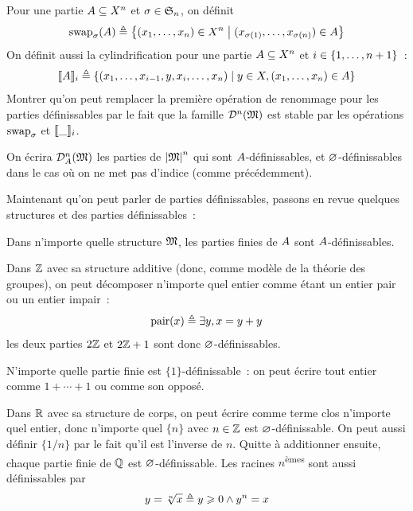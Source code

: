 \begin{exercise}
  Pour une partie $A\subseteq X^n$ et $\sigma\in\mathfrak{S}_{n}$, on
  définit
  \[\operatorname{swap}_{\sigma}(A) \triangleq
  \left\{ (x_1,\ldots,x_n)\in X^n \;\middle\vert\; (x_{\sigma(1)},\ldots,x_{\sigma(n)})\in A \right\}
  \]
  On définit aussi la cylindrification pour une partie $A\subseteq X^n$
  et $i\in\{1,\ldots,n+1\}$~:
  \[\llbracket A\rrbracket_i \triangleq
  \left\{ (x_1,\ldots,x_{i-1},y,x_i,\ldots,x_n) \;\middle\vert\; y \in X, (x_1,\ldots,x_n)\in A \right\}\]
  Montrer qu'on peut remplacer la première opération de renommage pour les
  parties définissables par le fait que la famille $\mathcal{D}^{n}(\mathfrak{M})$
  est stable par les opérations $\operatorname{swap}_{\sigma}$ et $\llbracket \mathord{\_}\rrbracket_i$.
\end{exercise}

\begin{notation}
  On écrira $\mathcal{D}_{A}^{n}(\mathfrak{M})$ les parties de $\left\vert \mathfrak{M}\right\vert^n$ qui sont
  $A$-définissables, et $\varnothing$-définissables dans le cas où on ne met pas
  d'indice (comme précédemment).
\end{notation}

Maintenant qu'on peut parler de parties définissables, passons en revue quelques
structures et des parties définissables~:

\begin{example}
  Dans n'importe quelle structure $\mathfrak{M}$, les parties finies de $A$
  sont $A$-définissables.
\end{example}

\begin{example}
  Dans $\mathbb Z$ avec sa structure additive (donc, comme modèle de la théorie des
  groupes), on peut décomposer n'importe quel entier comme étant un entier pair
  ou un entier impair~:
  \[\operatorname{pair}(x) \triangleq \exists y, x = y + y\]
  les deux parties $2\mathbb Z$ et $2\mathbb Z+1$ sont donc $\varnothing$-définissables.

  N'importe quelle partie finie est $\{1\}$-définissable~: on peut écrire
  tout entier comme $1+\cdots+1$ ou comme son opposé.
\end{example}

\begin{example}
  Dans $\mathbb R$ avec sa structure de corps, on peut écrire comme terme clos
  n'importe quel entier, donc n'importe quel $\{n\}$ avec $n \in \mathbb Z$ est
  $\varnothing$-définissable. On peut aussi définir $\{1/n\}$ par le fait qu'il
  est l'inverse de $n$. Quitte à additionner ensuite, chaque partie finie
  de $\mathbb Q$ est $\varnothing$-définissable. Les racines {$n$}\textsuperscript{èmes}
  sont aussi définissables par
  \[y = \sqrt[n]{x} \triangleq y \geqslant 0 \land y^n = x\]
\end{example}

